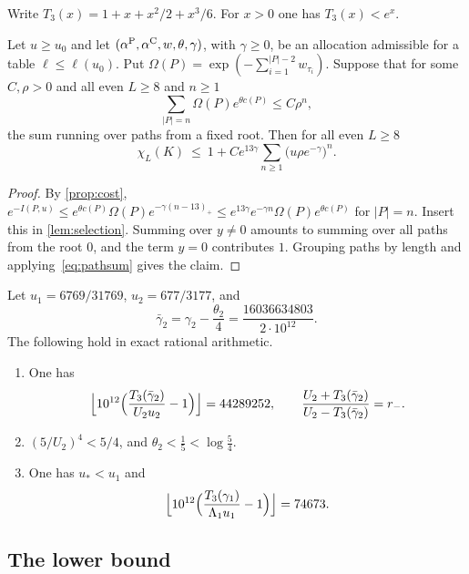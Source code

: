 Write $T_3(x)=1+x+x^2/2+x^3/6$. For $x>0$ one has $T_3(x)<e^x$.

\begin{proposition}\label{prop:geometric}
Let $u\ge u_0$ and let $(\alpha^{\rm P},\alpha^{\rm C},w,\theta,\gamma)$, with $\gamma\ge0$, be an allocation admissible for a table $\ell\le\ell(u_0)$. Put $\Omega(P)=\exp(-\sum_{i=1}^{|P|-2}w_{\tau_i})$. Suppose that for some $C,\rho>0$ and all even $L\ge8$ and $n\ge1$
\begin{equation}\label{eq:pathsum}
 \sum_{|P|=n}\Omega(P)e^{\theta c(P)}\le C\rho^n,
\end{equation}
the sum running over paths from a fixed root. Then for all even $L\ge8$
\[
 \chi_L(K)\ \le\ 1+Ce^{13\gamma}\sum_{n\ge1}\bigl(u\rho e^{-\gamma}\bigr)^n .
\]
\end{proposition}

\begin{proof}
By \cref{prop:cost}, $e^{-I(P,u)}\le e^{\theta c(P)}\Omega(P)e^{-\gamma(n-13)_+}\le e^{13\gamma}e^{-\gamma n}\Omega(P)e^{\theta c(P)}$ for $|P|=n$. Insert this in \cref{lem:selection}. Summing over $y\ne0$ amounts to summing over all paths from the root $0$, and the term $y=0$ contributes $1$. Grouping paths by length and applying~\eqref{eq:pathsum} gives the claim.
\end{proof}

\begin{certificate}\label{cert:endpoint-lower}
Let $u_1=6769/31769$, $u_2=677/3177$, and
\[
 \bar\gamma_2=\gamma_2-\frac{\theta_2}4=\frac{16036634803}{2\cdot10^{12}} .
\]
The following hold in exact rational arithmetic.
\begin{enumerate}[label=\textup{(\alph*)}]
\item One has
\[
 \Bigl\lfloor10^{12}\Bigl(\frac{T_3(\bar\gamma_2)}{U_2u_2}-1\Bigr)\Bigr\rfloor=44289252,\qquad
 \frac{U_2+T_3(\bar\gamma_2)}{U_2-T_3(\bar\gamma_2)}=r_- .
\]
\item $(5/U_2)^4<5/4$, and $\theta_2<\frac15<\log\frac54$.
\item One has $u_*<u_1$ and
\[
 \Bigl\lfloor10^{12}\Bigl(\frac{T_3(\gamma_1)}{\Lambda_1u_1}-1\Bigr)\Bigr\rfloor=74673 .
\]
\end{enumerate}
\end{certificate}

\subsection{The lower bound}

